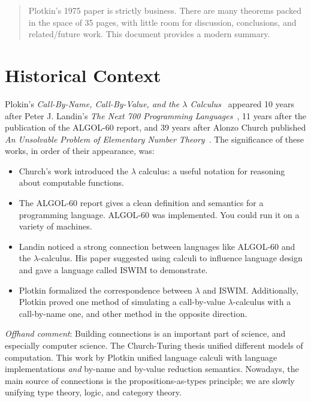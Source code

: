 \documentclass{article}
\begin{document}

\begin{abstract}
  Plotkin's 1975 paper is strictly business.
  There are many theorems packed in the space of 35 pages, with little room for discussion, conclusions, and related/future work.
  This document provides a modern summary.
\end{abstract}


\section{Historical Context}
Plokin's \emph{Call-By-Name, Call-By-Value, and the $\lambda$ Calculus}~\cite{p-call} appeared 10 years after Peter J. Landin's \emph{The Next 700 Programming Languages}~\cite{l-next},
 11 years after the publication of the ALGOL-60 report,
 and 39 years after Alonzo Church published \emph{An Unsolvable Problem of Elementary Number Theory}~\cite{c-unsolvable}.
The significance of these works, in order of their appearance, was:
\begin{itemize}
\item
  Church's work introduced the $\lambda$ calculus: a useful notation for reasoning about computable functions.
\item
  The ALGOL-60 report gives a clean definition and semantics for a programming language.
  ALGOL-60 was implemented.
  You could run it on a variety of machines.
\item
  Landin noticed a strong connection between languages like ALGOL-60 and the $\lambda$-calculus.
  His paper suggested using calculi to influence language design and gave a language called ISWIM to demonstrate.
\item
  Plotkin formalized the correspondence between $\lambda$ and ISWIM.
  Additionally, Plotkin proved one method of simulating a call-by-value $\lambda$-calculus with a call-by-name one, and other method in the opposite direction.
\end{itemize}


\emph{Offhand comment}: Building connections is an important part of science, and especially computer science.
The Church-Turing thesis unified different models of computation.
This work by Plotkin unified language calculi with language implementations \emph{and} by-name and by-value reduction semantics.
Nowadays, the main source of connections is the propositions-as-types principle; we are slowly unifying type theory, logic, and category theory.
\end{document}
